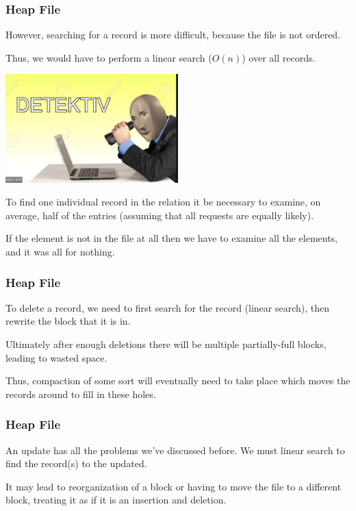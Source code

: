 \begin{frame}
\frametitle{Heap File}
However, searching for a record is more difficult, because the file is not ordered.

Thus, we would have to perform a linear search ($O(n)$) over all records. 

\end{frame}


\begin{frame}
\begin{center}
	\includegraphics[width=0.5\textwidth]{images/detektiv.png}
\end{center}

To find one individual record in the relation it be necessary to examine, on average, half of the entries (assuming that all requests are equally likely).

If the element is not in the file at all then we have to examine all the elements, and it was all for nothing.

\end{frame}



\begin{frame}
\frametitle{Heap File}

To delete a record, we need to first search for the record (linear search), then rewrite the block that it is in. 

Ultimately after enough deletions there will be multiple partially-full blocks, leading to wasted space. 

Thus, compaction of some sort will eventually need to take place which moves the records around to fill in these holes.

\end{frame}


\begin{frame}
\frametitle{Heap File}

An update has all the problems we've discussed before. We must linear search to find the record(s) to the updated. 

It may lead to reorganization of a block or having to move the file to a different block, treating it as if it is an insertion and deletion.  

\end{frame}



